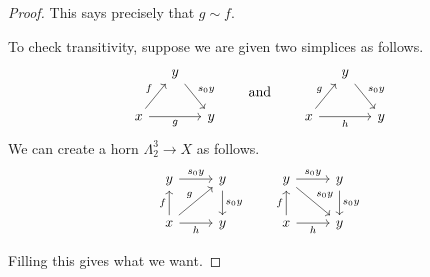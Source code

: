 \documentclass[main.tex]{subfiles}
\begin{document}
\begin{proof}
  This says precisely that $g \sim f$.

  To check transitivity, suppose we are given two simplices as follows.
  \begin{equation*}
    \begin{tikzcd}[column sep=small]
      & y
      \arrow[dr, "s_{0}y"]
      \\
      x
      \arrow[ur, "f"]
      \arrow[rr, swap, "g"]
      && y
    \end{tikzcd}
    \qquad\text{and}\qquad
    \begin{tikzcd}[column sep=small]
      & y
      \arrow[dr, "s_{0}y"]
      \\
      x
      \arrow[ur, "g"]
      \arrow[rr, swap, "h"]
      && y
    \end{tikzcd}
  \end{equation*}
  We can create a horn $\Lambda^{3}_{2} \to X$ as follows.
  \begin{equation*}
    \begin{tikzcd}
      y
      \arrow[r, "s_{0}y"]
      & y
      \arrow[d, "s_{0}y"]
      \\
      x
      \arrow[r, swap, "h"]
      \arrow[u, "f"]
      \arrow[ur, "g"]
      & y
    \end{tikzcd}
    \qquad
    \begin{tikzcd}
      y
      \arrow[r, "s_{0}y"]
      \arrow[dr, "s_{0}y"]
      & y
      \arrow[d, "s_{0}y"]
      \\
      x
      \arrow[r, swap, "h"]
      \arrow[u, "f"]
      & y
    \end{tikzcd}
  \end{equation*}

  Filling this gives what we want.
\end{proof}
\end{document}
